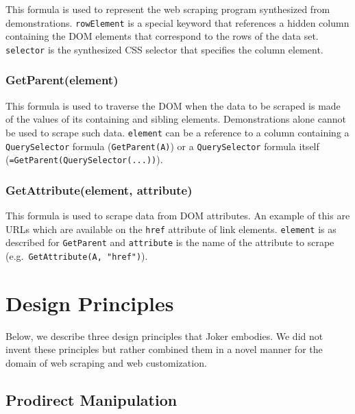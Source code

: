 \documentclass[sigconf,10pt]{acmart}
\begin{document}
This formula is used to represent the web scraping program synthesized
from demonstrations. \texttt{rowElement} is a special keyword that
references a hidden column containing the DOM elements that correspond
to the rows of the data set. \texttt{selector} is the synthesized CSS
selector that specifies the column element.

\hypertarget{getparentelement}{%
\subsubsection{GetParent(element)}\label{getparentelement}}

This formula is used to traverse the DOM when the data to be scraped is
made of the values of its containing and sibling elements.
Demonstrations alone cannot be used to scrape such data.
\texttt{element} can be a reference to a column containing a
\texttt{QuerySelector} formula (\texttt{GetParent(A)}) or a
\texttt{QuerySelector} formula itself
(\texttt{=GetParent(QuerySelector(...))}).

\hypertarget{getattributeelement-attribute}{%
\subsubsection{GetAttribute(element,
attribute)}\label{getattributeelement-attribute}}

This formula is used to scrape data from DOM attributes. An example of
this are URLs which are available on the \texttt{href} attribute of link
elements. \texttt{element} is as described for \texttt{GetParent} and
\texttt{attribute} is the name of the attribute to scrape
(e.g.~\texttt{GetAttribute(A,\ "href")}).

\hypertarget{sec:design-principles}{%
\section{Design Principles}\label{sec:design-principles}}

Below, we describe three design principles that Joker embodies. We did
not invent these principles but rather combined them in a novel manner
for the domain of web scraping and web customization.

\hypertarget{prodirect-manipulation}{%
\subsection{Prodirect Manipulation}\label{prodirect-manipulation}}
\end{document}
